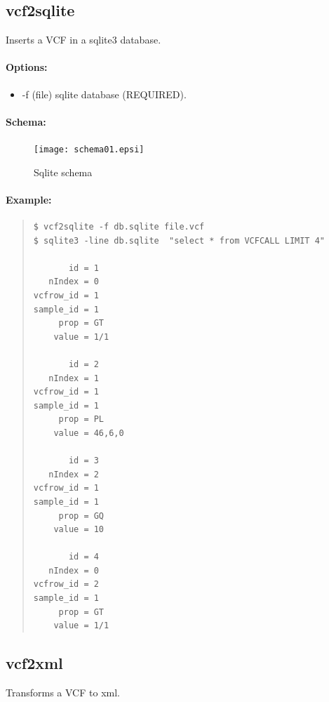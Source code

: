 \documentclass[12pt]{article}
\begin{document}
\subsection{vcf2sqlite}
Inserts a VCF in a sqlite3 database.
\paragraph{Options:}
\begin{itemize}
\item-f (file) sqlite database (REQUIRED).
\end{itemize}
\paragraph{Schema:}
\begin{figure}
\texttt{[image: schema01.epsi]}
\caption{Sqlite schema}
\end{figure}
\paragraph{Example:}
\begin{quote}
\begin{verbatim}
$ vcf2sqlite -f db.sqlite file.vcf
$ sqlite3 -line db.sqlite  "select * from VCFCALL LIMIT 4"

       id = 1
   nIndex = 0
vcfrow_id = 1
sample_id = 1
     prop = GT
    value = 1/1

       id = 2
   nIndex = 1
vcfrow_id = 1
sample_id = 1
     prop = PL
    value = 46,6,0

       id = 3
   nIndex = 2
vcfrow_id = 1
sample_id = 1
     prop = GQ
    value = 10

       id = 4
   nIndex = 0
vcfrow_id = 2
sample_id = 1
     prop = GT
    value = 1/1

\end{verbatim}
\end{quote}

\subsection{vcf2xml}
Transforms a VCF to xml.
\end{document}
